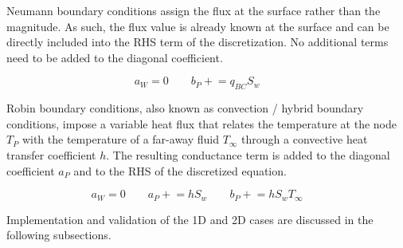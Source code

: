 Neumann boundary conditions assign the flux at the surface rather than the magnitude. As such, the flux value is already known at the surface and can be directly included into the RHS term of the discretization. No additional terms need to be added to the diagonal coefficient.

\begin{equation}~\label{eqDiffBCNeu}
    a_W = 0 \qquad
    b_P \mathrel{+}= q_{BC} S_w \qquad
\end{equation}

Robin boundary conditions, also known as convection / hybrid boundary conditions, impose a variable heat flux that relates the temperature at the node $T_P$ with the temperature of a far-away fluid $T_\infty$ through a convective heat transfer coefficient $h$. The resulting conductance term is added to the diagonal coefficient $a_P$ and to the RHS of the discretized equation.

\begin{equation}~\label{eqDiffBCRob}
    a_W = 0 \qquad
    a_P \mathrel{+}= h S_w \qquad
    b_P \mathrel{+}= h S_w T_\infty \qquad
\end{equation}

Implementation and validation of the 1D and 2D cases are discussed in the following subsections.



